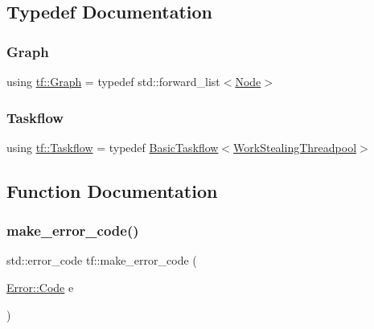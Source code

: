 \subsection{Typedef Documentation}
\mbox{\label{namespacetf_a2afa7da139285640eaf8122535136dc9}} 
\subsubsection{\texorpdfstring{Graph}{Graph}}
{\footnotesize\ttfamily using \hyperlink{namespacetf_a2afa7da139285640eaf8122535136dc9}{tf\+::\+Graph} = typedef std\+::forward\+\_\+list$<$\hyperlink{classtf_1_1Node}{Node}$>$}

\mbox{\label{namespacetf_aa4b65604639a98fffa65678506be94c9}} 
\subsubsection{\texorpdfstring{Taskflow}{Taskflow}}
{\footnotesize\ttfamily using \hyperlink{namespacetf_aa4b65604639a98fffa65678506be94c9}{tf\+::\+Taskflow} = typedef \hyperlink{classtf_1_1BasicTaskflow}{Basic\+Taskflow}$<$\hyperlink{classtf_1_1WorkStealingThreadpool}{Work\+Stealing\+Threadpool}$>$}



\subsection{Function Documentation}
\mbox{\label{namespacetf_aba49ed1abcd24ee88f72374c706c3b87}} 
\subsubsection{\texorpdfstring{make\+\_\+error\+\_\+code()}{make\_error\_code()}}
{\footnotesize\ttfamily std\+::error\+\_\+code tf\+::make\+\_\+error\+\_\+code (\begin{DoxyParamCaption}\item[{\hyperlink{structtf_1_1Error_aad6732b815bfe4ae3cea402042ee43a3}{Error\+::\+Code}}]{e }\end{DoxyParamCaption})\hspace{0.3cm}{\ttfamily [inline]}}

